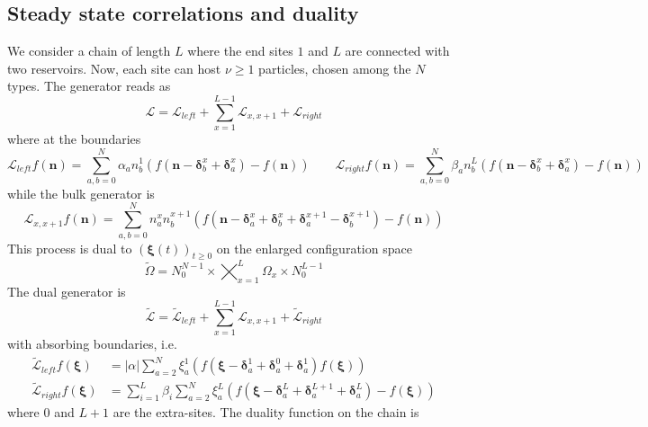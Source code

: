 \documentclass[10pt]{article}
\numberwithin{equation}{section}
\numberwithin{equation}{subsection}
\begin{document}
\subsection{Steady state correlations and duality}
We consider a chain of length $L$ where the end sites $1$ and $L$ are connected with two reservoirs. Now, each site can host $\nu\geq 1$ particles, chosen among the $N$ types. The generator reads as
\begin{equation}
	\mathcal{L}=\mathcal{L}_{left}+\sum_{x=1}^{L-1}\mathcal{L}_{x,x+1}+\mathcal{L}_{right}
\end{equation} 
where at the boundaries 
\begin{equation}
	\mathcal{L}_{left}f(\bm{n})=\sum_{a,b=0}^{N}\alpha_{a}n_{b}^{1}\left(f(\bm{n}-\bm{\delta}_{b}^{x}+\bm{\delta}_{a}^{x})-f(\bm{n})\right)\qquad \mathcal{L}_{right}f(\bm{n})=\sum_{a,b=0}^{N}\beta_{a}n_{b}^{L}\left(f(\bm{n}-\bm{\delta}_{b}^{x}+\bm{\delta}_{a}^{x})-f(\bm{n})\right)
\end{equation}
while the bulk generator is 
\begin{equation}
 \mathcal{L}_{x,x+1}f(\bm{n})=\sum_{a,b=0}^{N}n_{a}^{x}n_{b}^{x+1}\left(f(\bm{n}-\bm{\delta}_{a}^{x}+\bm{\delta}_{b}^{x}+\bm{\delta}_{a}^{x+1}-\bm{\delta}_{b}^{x+1})-f(\bm{n})\right)
\end{equation}
This process is dual to $(\bm{\xi}(t))_{t\geq0} $ on the enlarged configuration space
 \begin{equation}	
	\widetilde{\Omega}=N_{0}^{N-1}\times\bigtimes_{x=1}^{L} \Omega_{x}\times N_{0}^{L-1}
\end{equation}
The dual generator is 
\begin{equation}
	\widetilde{\mathcal{L}}=\widetilde{\mathcal{L}}_{left}+\sum_{x=1}^{L-1}\mathcal{L}_{x,x+1}+\widetilde{\mathcal{L}}_{right}
\end{equation} 
with absorbing boundaries, i.e. 
\begin{equation}
	\begin{split}
		\widetilde{\mathcal{L}}_{left}f(\bm{\xi})&=|\alpha|\sum_{a=2}^{N}\xi_{a}^{1}\left(f(\bm{\xi}-\bm{\delta}_{a}^{1}+\bm{\delta}_{a}^{0}+\bm{\delta}_{a}^{1})f(\bm{\xi})\right)\\\widetilde{\mathcal{L}}_{right}f(\bm{\xi})&=\sum_{i=1}^{L}\beta_{i}\sum_{a=2}^{N}\xi_{a}^{L}\left(f(\bm{\xi}-\bm{\delta}_{a}^{L}+\bm{\delta}_{a}^{L+1}+\bm{\delta}_{a}^{L})-f(\bm{\xi})\right)
	\end{split}
\end{equation}
where $0$ and $L+1$ are the extra-sites. The duality function on the chain is
\end{document}
